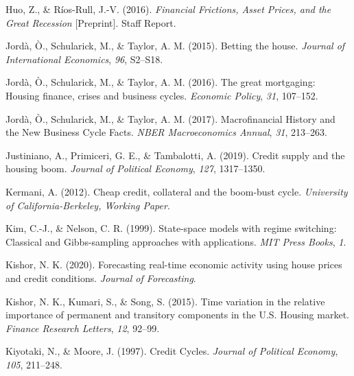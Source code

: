 \documentclass[
  12pt,
]{article}
\newlength{\cslhangindent}
\newlength{\cslentryspacingunit} %
\newenvironment{CSLReferences}[2] %
 {%
  \setlength{\parindent}{0pt}
  \ifodd #1
  \let\oldpar\par
  \def\par{\hangindent=\cslhangindent\oldpar}
  \fi
  \setlength{\parskip}{#2\cslentryspacingunit}
 }%
 {}
\begin{document}
\begin{CSLReferences}{1}{0}
\leavevmode{}%
Huo, Z., \& Ríos-Rull, J.-V. (2016). \emph{Financial {Frictions}, {Asset Prices}, and the {Great Recession}} {[}Preprint{]}. {Staff Report}.

\leavevmode{}%
Jordà, Ò., Schularick, M., \& Taylor, A. M. (2015). Betting the house. \emph{Journal of International Economics}, \emph{96}, S2--S18.

\leavevmode{}%
Jordà, Ò., Schularick, M., \& Taylor, A. M. (2016). The great mortgaging: Housing finance, crises and business cycles. \emph{Economic Policy}, \emph{31}, 107--152.

\leavevmode{}%
Jordà, Ò., Schularick, M., \& Taylor, A. M. (2017). Macrofinancial {History} and the {New Business Cycle Facts}. \emph{NBER Macroeconomics Annual}, \emph{31}, 213--263.

\leavevmode{}%
Justiniano, A., Primiceri, G. E., \& Tambalotti, A. (2019). Credit supply and the housing boom. \emph{Journal of Political Economy}, \emph{127}, 1317--1350.

\leavevmode{}%
Kermani, A. (2012). Cheap credit, collateral and the boom-bust cycle. \emph{University of California-Berkeley, Working Paper}.

\leavevmode{}%
Kim, C.-J., \& Nelson, C. R. (1999). State-space models with regime switching: Classical and {Gibbs}-sampling approaches with applications. \emph{MIT Press Books}, \emph{1}.

\leavevmode{}%
Kishor, N. K. (2020). Forecasting real-time economic activity using house prices and credit conditions. \emph{Journal of Forecasting}.

\leavevmode{}%
Kishor, N. K., Kumari, S., \& Song, S. (2015). Time variation in the relative importance of permanent and transitory components in the {U}.{S}. Housing market. \emph{Finance Research Letters}, \emph{12}, 92--99.

\leavevmode{}%
Kiyotaki, N., \& Moore, J. (1997). Credit {Cycles}. \emph{Journal of Political Economy}, \emph{105}, 211--248.


\end{CSLReferences}
\end{document}

